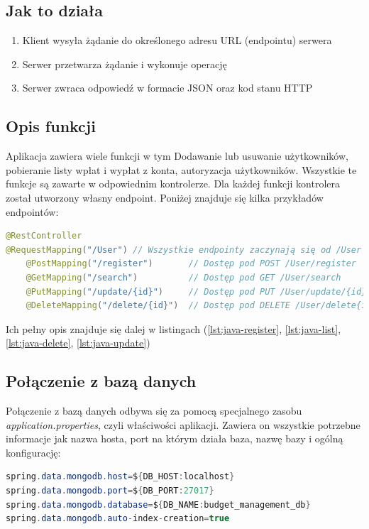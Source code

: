 \subsection*{Jak to działa}
\begin{enumerate}
	\item Klient wysyła żądanie do określonego adresu URL (endpointu) serwera
	\item Serwer przetwarza żądanie i wykonuje operację
	\item Serwer zwraca odpowiedź w formacie JSON oraz kod stanu HTTP
\end{enumerate}
\subsection*{Opis funkcji}
Aplikacja zawiera wiele funkcji w tym Dodawanie lub usuwanie użytkowników, pobieranie listy wpłat i wypłat z konta, autoryzacja użytkowników. Wszystkie te funkcje są zawarte w odpowiednim kontrolerze. Dla każdej funkcji kontrolera został utworzony własny endpoint. Poniżej znajduje się kilka przykładów endpointów:
\begin{lstlisting}[language={Java}, caption={Przykładowe Endpointy}, label={lst:java-endpoints}]
@RestController 
@RequestMapping("/User") // Wszystkie endpointy zaczynają się od /User
	@PostMapping("/register")		// Dostęp pod POST /User/register
	@GetMapping("/search")			// Dostęp pod GET /User/search
	@PutMapping("/update/{id}")		// Dostęp pod PUT /User/update/{id}
	@DeleteMapping("/delete/{id}")	// Dostęp pod DELETE /User/delete{id}
\end{lstlisting}
Ich pełny opis znajduje się dalej w listingach (\ref{lst:java-register}, \ref{lst:java-list}, \ref{lst:java-delete}, \ref{lst:java-update})
\subsection*{Połączenie z bazą danych}
Połączenie z bazą danych odbywa się za pomocą specjalnego zasobu \textit{application.properties}, czyli właściwości aplikacji. Zawiera on wszystkie potrzebne informacje jak nazwa hosta, port na którym działa baza, nazwę bazy i ogólną konfigurację: 
\begin{lstlisting}[language={Java}, caption={application.properties}, label={lst:java-application.properties}]
spring.data.mongodb.host=${DB_HOST:localhost}
spring.data.mongodb.port=${DB_PORT:27017}
spring.data.mongodb.database=${DB_NAME:budget_management_db}
spring.data.mongodb.auto-index-creation=true
\end{lstlisting}

